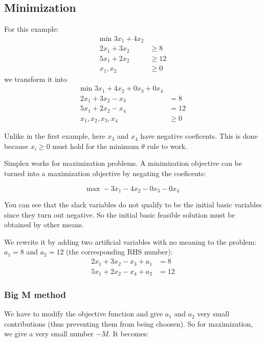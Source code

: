 \documentclass[12pt]{article}
\begin{document}
\subsection{Minimization}

For this example:
\begin{align*}
    \text{min } 3x_1 + 4x_2 \\
    2x_1 + 3x_2 &\ge 8 \\
    5x_1 + 2x_2 &\ge 12 \\
    x_1,x_2 &\ge 0
\end{align*}
we transform it into
\begin{align*}
    \text{min } 3x_1 + 4x_2 + 0x_3 + 0x_4 \\
    2x_1 + 3x_2 - x_3 &= 8 \\
    5x_1 + 2x_2 - x_4 &= 12 \\
    x_1,x_2,x_3,x_4 &\ge 0
\end{align*}

Unlike in the first example, here $x_3$ and $x_4$ have negative coeficents. This
is done because $x_i \ge 0$ must hold for the minimum $\theta$ rule to work.

Simplex works for maximization problems. A minimization objective can be turned
into a maximization objective by negating the coeficents:

\begin{equation*}
    \text{max } -3x_1 - 4x_2 - 0x_3 - 0x_4
\end{equation*}

You can see that the slack variables do not qualify to be the initial basic
variables since they turn out negative. So the initial basic feasible solution
must be obtained by other means.

We rewrite it by adding two artificial variables with no meaning to the
problem: $a_1 = 8$ and $a_2 = 12$ (the corresponding RHS number):
\begin{align*}
    2x_1 + 3x_2 - x_3 + a_1 &= 8 \\
    5x_1 + 2x_2 - x_4 + a_2 &= 12
\end{align*}

\subsubsection{Big M method}

We have to modify the objective function and give $a_1$ and $a_2$ very small
contributions (thus preventing them from being choosen). So for maximization,
we give a very small number $-M$. It becomes:
\end{document}
